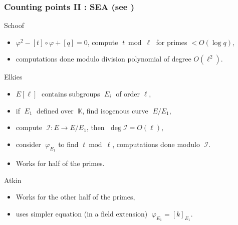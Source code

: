 \documentclass[10pt]{beamer}
\newcommand{\K}{\mathbb{K}}  %
\newcommand{\frob}{\varphi}  %
\newcommand{\0}{\mathcal{O}}  %
\newcommand{\isog}[1]{\mathcal{#1}}  %
\newcommand{\I}{\isog{I}}  %
\begin{document}

\begin{frame}
  \frametitle{Counting points II : SEA (see \cite{Scho95})}
  
  \begin{block}{Schoof}
    \begin{itemize}
    \item $\frob^2 - [t]\circ\frob + [q] = 0$, compute
      $\;t\bmod\ell\;$ for primes $<O(\log q)$,
    \item computations done modulo division polynomial of degree
      $O(\ell^2)$.
    \end{itemize}
  \end{block}

  \begin{block}{Elkies}
    \begin{itemize}
    \item $E[\ell]\;$ contains subgroups $\;E_i\;$ of order $\ell$,
    \item if $\;E_1\;$ defined over $\;\K$, find isogenous curve
      $\;E/E_1$,
    \item compute $\;\I:E\rightarrow E/E_1$, then $\;\deg\I = O(\ell)$,
    \item consider $\;\frob_{E_1}$ to find $\;t\bmod\ell$,
      computations done modulo $\;\I$.
    \item Works for half of the primes.
    \end{itemize}
  \end{block}

  \begin{block}{Atkin}
    \begin{itemize}
    \item Works for the other half of the primes,
    \item uses simpler equation (in a field extension)
      $\;\frob_{E_1}=[k]_{E_1}$.
    \end{itemize}
  \end{block}
\end{frame}

\end{document}
